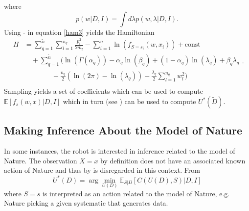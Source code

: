where
\begin{equation}
	p(w|D,I) = \int d\lambda p(w,\lambda|D,I).
\end{equation}
Using - in equation \eqref{ham3} yields the Hamiltonian
\begin{equation}
	\begin{split}
		H&=\sum_{q=1}^{\tilde{n}}\sum_{l=1}^{n_q}\frac{p_{l}^2}{2m_{l}}-\sum_{i=1}^{n}\ln(f_{S = s_i}(w,x_i))+\text{const}\\
		&\quad+\sum_{q=1}^{\tilde{n}}\bigg(\ln(\Gamma(\alpha_q))-\alpha_q\ln(\beta_q)+(1-\alpha_q)\ln(\lambda_q)+\beta_q\lambda_q\\
		&\qquad \qquad+\frac{n_q}{2}(\ln(2\pi)-\ln(\lambda_q))+\frac{\lambda_q}{2}\sum_{l=1}^{n_q}w_l^2\bigg)\\
	\end{split}.
	\label{ham2}
\end{equation}
Sampling  yields a set of coefficients which can be used to compute $\mathbb{E}[f_s(w,x)|D,I]$ which in turn (see ) can be used to compute $U^*(\tilde{D})$.


\subsection{Making Inference About the Model of Nature}
In some instances, the robot is interested in inference related to the model of Nature. The observation $X=x$ by definition does not have an associated known action of Nature and thus by  is disregarded in this context. From 
\begin{equation}
	U^*(D) = \arg\min_{U(D)} \mathbb{E}_{S|D}[C(U(D), S)|D,I]
	\label{eq:best_decision}
\end{equation}
where $S=s$ is interpreted as an action related to the model of Nature, e.g. Nature picking a given systematic that generates data.


